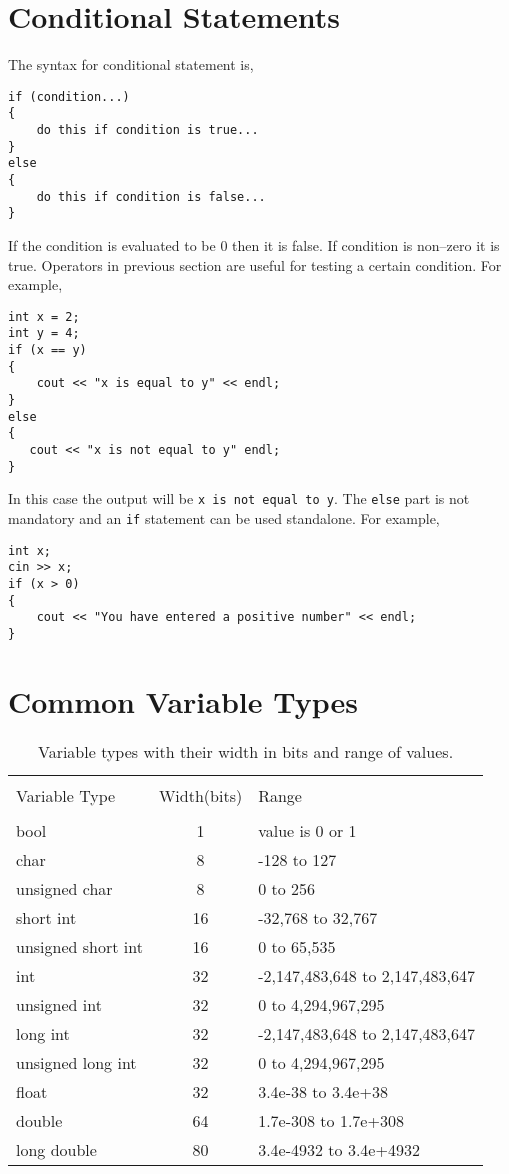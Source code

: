 \documentclass[12pt,a4paper]{article}
\begin{document}
\section{Conditional Statements}
The syntax for conditional statement is,
\begin{lstlisting}
if (condition...)
{
    do this if condition is true...
}
else
{
    do this if condition is false...
}
\end{lstlisting}
If the condition is evaluated to be 0 then it is false. If condition is non--zero it is true.
Operators in previous section are useful for testing a certain condition. For example,
\begin{lstlisting}
int x = 2;
int y = 4;
if (x == y)
{
    cout << "x is equal to y" << endl;
}
else
{
   cout << "x is not equal to y" endl;
}
\end{lstlisting}
In this case the output will be \verb|x is not equal to y|. The \verb|else| part is not mandatory and an \verb|if| statement can be used standalone. For example,
\begin{lstlisting}
int x;
cin >> x;
if (x > 0)
{
    cout << "You have entered a positive number" << endl;
}
\end{lstlisting}
\section{Common Variable Types}
\begin{table}[htb]
\centering
	\begin{tabular}{l c l}
	\hline \hline \\ [-2ex]
	Variable Type & Width(bits) & Range\\
	\hline \\ [-2ex]
	bool\footnotemark[1]~ & 1  & value is 0 or 1\\
	char               & 8  & -128 to 127\\
	unsigned char      & 8  & 0 to 256\\
	short int          & 16 & -32,768 to 32,767\\
	unsigned short int & 16 & 0 to 65,535\\
	int                & 32 & -2,147,483,648 to 2,147,483,647\\
	unsigned int       & 32 & 0 to 4,294,967,295\\
	long int           & 32 & -2,147,483,648 to 2,147,483,647\\
	unsigned long int  & 32 & 0 to 4,294,967,295\\
	float              & 32 & 3.4e-38 to 3.4e+38\\
	double             & 64 & 1.7e-308 to 1.7e+308\\
	long double        & 80 & 3.4e-4932 to 3.4e+4932\\
	\hline \hline
	\end{tabular}
\caption{Variable types with their width in bits and range of values.}
\label{Datatypes and Ranges}
\end{table}
\end{document}
